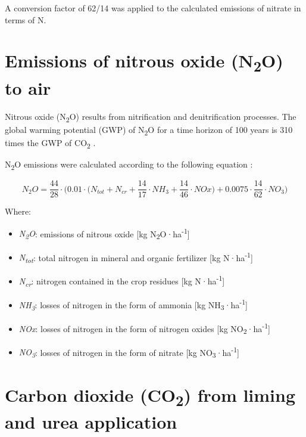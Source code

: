 \documentclass[openany]{book}
\begin{document}
A conversion factor of 62/14 was applied to the calculated emissions of nitrate in terms of N.

\hypertarget{emissions-of-nitrous-oxide-n2o-to-air}{%
\section{\texorpdfstring{Emissions of nitrous oxide (N\textsubscript{2}O) to air}{Emissions of nitrous oxide (N2O) to air}}\label{emissions-of-nitrous-oxide-n2o-to-air}}

Nitrous oxide (N\textsubscript{2}O) results from nitrification and denitrification processes. The global warming potential (GWP) of N\textsubscript{2}O for a time horizon of 100 years is 310 times the GWP of CO\textsubscript{2} \citep{IPCC2006}.

N\textsubscript{2}O emissions were calculated according to the following equation \citep{IPCC2006}:

\[N_2O = \frac{44}{28} \cdot \bigg (0.01 \cdot \Big(N_{tot} + N_{cr} + \frac{14}{17} \cdot NH_3 + \frac{14}{46} \cdot NOx \Big) + 0.0075 \cdot \frac{14}{62} \cdot NO_3 \bigg)\]

Where:

\begin{itemize}
\item
  \emph{N\textsubscript{2}O}: emissions of nitrous oxide {[}kg N\textsubscript{2}O·ha\textsuperscript{-1}{]}
\item
  \emph{N\textsubscript{tot}}: total nitrogen in mineral and organic fertilizer {[}kg N·ha\textsuperscript{-1}{]}
\item
  \emph{N\textsubscript{cr}}: nitrogen contained in the crop residues {[}kg N·ha\textsuperscript{-1}{]}
\item
  \emph{NH\textsubscript{3}}: losses of nitrogen in the form of ammonia {[}kg NH\textsubscript{3}·ha\textsuperscript{-1}{]}
\item
  \emph{NOx}: losses of nitrogen in the form of nitrogen oxides {[}kg NO\textsubscript{2}·ha\textsuperscript{-1}{]}
\item
  \emph{NO\textsubscript{3}}: losses of nitrogen in the form of nitrate {[}kg NO\textsubscript{3}·ha\textsuperscript{-1}{]}
\end{itemize}

\hypertarget{carbon-dioxide-co2-from-liming-and-urea-application}{%
\section{\texorpdfstring{Carbon dioxide (CO\textsubscript{2}) from liming and urea application}{Carbon dioxide (CO2) from liming and urea application}}\label{carbon-dioxide-co2-from-liming-and-urea-application}}
\end{document}
